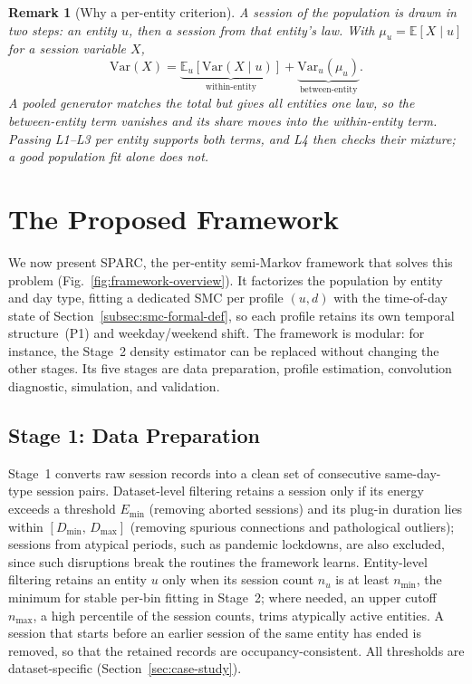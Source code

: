 \documentclass[journal]{IEEEtran}
\newtheorem{remark}{Remark}
\begin{document}
\begin{remark}[Why a per-entity criterion]
\label{rem:per-entity-criterion}
A session of the population is drawn in two steps: an entity $u$, then a session from that entity's law. With $\mu_u = \mathbb{E}[X \mid u]$ for a session variable $X$,
\begin{equation}
    \mathrm{Var}(X) =
    \underbrace{\mathbb{E}_u\!\left[\mathrm{Var}(X \mid u)\right]}_{\text{within-entity}}
    + \underbrace{\mathrm{Var}_u\!\left(\mu_u\right)}_{\text{between-entity}}.
    \label{eq:total-variance}
\end{equation}
A pooled generator matches the total but gives all entities one law, so the between-entity term vanishes and its share moves into the within-entity term. Passing L1--L3 per entity supports both terms, and L4 then checks their mixture; a good population fit alone does not.
\end{remark}

\section{The Proposed Framework}
\label{sec:framework}

We now present SPARC, the per-entity semi-Markov framework that solves this problem (Fig.~\ref{fig:framework-overview}). It factorizes the population by entity and day type, fitting a dedicated SMC per profile $(u,d)$ with the time-of-day state of Section~\ref{subsec:smc-formal-def}, so each profile retains its own temporal structure~(P1) and weekday/weekend shift. The framework is modular: for instance, the Stage~2 density estimator can be replaced without changing the other stages. Its five stages are data preparation, profile estimation, convolution diagnostic, simulation, and validation.

\subsection{Stage 1: Data Preparation}
\label{subsec:stage1}

Stage~1 converts raw session records into a clean set of consecutive same-day-type session pairs. Dataset-level filtering retains a session only if its energy exceeds a threshold $E_{\min}$ (removing aborted sessions) and its plug-in duration lies within $[D_{\min},\, D_{\max}]$ (removing spurious connections and pathological outliers); sessions from atypical periods, such as pandemic lockdowns, are also excluded, since such disruptions break the routines the framework learns. Entity-level filtering retains an entity $u$ only when its session count $n_u$ is at least $n_{\min}$, the minimum for stable per-bin fitting in Stage~2; where needed, an upper cutoff $n_{\max}$, a high percentile of the session counts, trims atypically active entities. A session that starts before an earlier session of the same entity has ended is removed, so that the retained records are occupancy-consistent. All thresholds are dataset-specific (Section~\ref{sec:case-study}).
\end{document}
